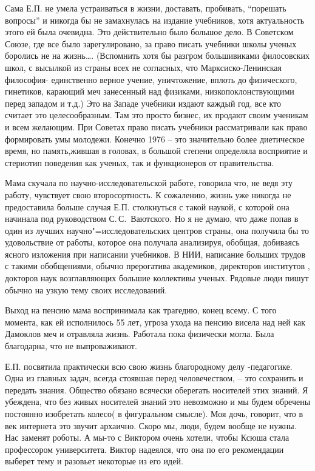 Сама Е.П. не умела устраиваться в жизни, доставать, пробивать, “порешать вопросы” и никогда бы не замахнулась на  издание  учебников, хотя актуальность этого ей была очевидна. Это действительно было большое дело. В Советском Союзе, где все было зарегулировано, за право писать учебники школы ученых боролись не на жизнь…. (Вспомнить хотя бы разгром большивиками филосовских школ, с высылкой из страны всех не согласных, что Марксиско-Ленинская философия- единственно верное учение, уничтожение, вплоть до физического, гинетиков, карающий меч занесенный над физиками, низкопоклонствующими перед западом  и т.д.) Это на Западе учебники издают каждый год, все кто считает это целесообразным. Там это просто бизнес, их продают своим ученикам и всем желающим. При Советах право писать учебники рассматривали как право формировать умы молодежи. Конечно 1976 – это значительно более диетическое время, но память,жившая в головах, в большой степени определяла восприятие и стериотип поведения как ученых, так и функционеров от правительства.

Мама скучала по научно-исследовательской работе, говорила что, не ведя эту работу, чувствует свою второсортность.
К сожалению, жизнь уже никогда не предоставила больше случая Е.П. столкнуться с такой наукой,
с которой она начинала под руководством С.\,С.~Ваютского.
Но я не думаю, что даже попав в один из лучших на\-уч\-но"=ис\-сле\-до\-ва\-тель\-с\-ких центров страны, она получила бы то удовольствие от работы, которое она получала анализируя, обобщая, добиваясь ясного изложения при написании учебников. В НИИ, написание больших трудов с такими обобщениями, обычно прерогатива академиков, директоров институтов , докторов наук возглавляющих большие коллективы ученых. Рядовые люди пишут обычно на узкую тему своих исследований.

Выход на пенсию мама воспринимала как трагедию, конец всему. С того момента, как ей исполнилось 55 лет, угроза ухода на пенсию висела над ней как Дамоклов меч и отравляла жизнь. Работала пока физически могла. Была благодарна, что не выпроваживают.

Е.П. посвятила практически всю свою жизнь благородному делу -педагогике. Одна из главных задач, всегда стоявшая перед человечеством, – это сохранить и передать знания. Общество обязано всячески оберегать носителей этих знаний. Я убеждена, что без живых носителей знаний это невозможно и мы будем обречены постоянно изобретать колесо( в фигуральном смысле). Моя дочь, говорит, что в век интернета это звучит архаично. Скоро мы, люди, будем вообще не нужны. Нас заменят роботы. А мы-то с Виктором очень хотели, чтобы Ксюша стала профессором университета. Виктор надеялся, что она по его рекомендации выберет тему и разовьет некоторые из его идей.

